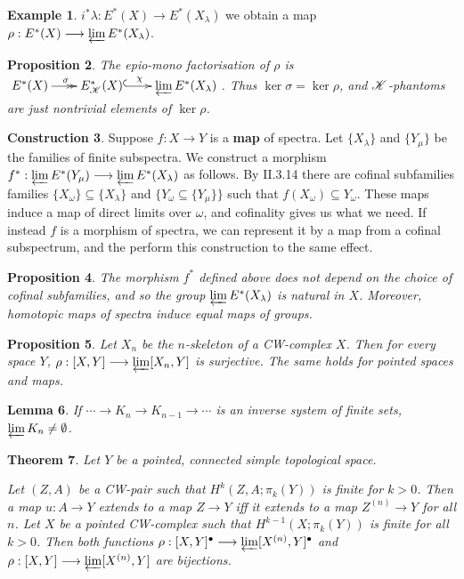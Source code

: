 \documentclass[11pt]{article}
\theoremstyle{plain}
\newtheorem{thm}{Theorem}[subsection]
\newtheorem{lem}[thm]{Lemma}
\newtheorem{prop}[thm]{Proposition}
\theoremstyle{definition}
\newtheorem{const}[thm]{Construction}
\newtheorem{exmp}[thm]{Example}
\begin{document}
{\begin{exmp}
$i^*\lambda:E^*(X)\to E^*(X_\lambda)$ we obtain a map $\rho:E^*(X)\to\varprojlim
E^*(X_\lambda)$.
\end{exmp}
\begin{prop}
The epio-mono factorisation of $\rho$ is
$\xymatrix@C=.7cm{E^*(X)\ar@{->>}[r]^\sigma&E^*_\scrK(X)
\ar@{^{(}->}[r]^{\chi\ \ }&\varprojlim E^*(X_\lambda)}$. Thus $\ker
\sigma=\ker\rho$, and $\scrK$-phantoms are just nontrivial elements of
$\ker\rho$.
\end{prop}
\begin{const}
Suppose $f:X\to Y$ is a \textbf{map} of spectra. Let $\{X_\lambda\}$ and
$\{Y_\mu\}$ be the families of finite subspectra. We construct a morphism
$f^*:\varprojlim E^*(Y_\mu)\to\varprojlim E^*(X_\lambda)$ as follows. By II.3.14
there are cofinal subfamilies families $\{X_\omega\}\subseteq \{X_\lambda\}$ and
$\{Y_\omega\subseteq\{Y_\mu\}\}$ such that $f(X_\omega)\subseteq Y_\omega$.
These maps induce a map of direct limits over $\omega$, and cofinality gives us
what we need. If instead $f$ is a morphism of spectra, we can represent it by a
map from a cofinal subspectrum, and the perform this construction to the same
effect.
\end{const}
\begin{prop}
The morphism $f^*$ defined above does not depend on the choice of cofinal
subfamilies, and so the group $\varprojlim E^*(X_\lambda)$ is natural in $X$.
Moreover, homotopic maps of spectra induce equal maps of groups.
\end{prop}
\begin{prop}
Let $X_n$ be the $n$-skeleton of a CW-complex $X$. Then for every space $Y$,
$\rho:[X,Y]\to \varprojlim[X_n,Y]$ is surjective. The same holds for pointed
spaces and maps.
\end{prop}
\begin{lem}
If $\cdots\rightarrow K_n\rightarrow K_{n-1}\rightarrow\cdots$ is an inverse
system of finite sets, $\varprojlim K_n\neq\emptyset$.
\end{lem}
\begin{thm}Let $Y$ be a pointed, connected simple topological space.
\begin{itemise}
\itm[(i)]Let $(Z,A)$ be a CW-pair such that $H^k(Z,A;\pi_k(Y))$ is finite for
$k>0$. Then a map $u:A\to Y$ extends to a map $Z\to Y$ iff it extends to a map
$Z^{(n)}\to Y$ for all $n$.
\itm[(ii)]Let $X$ be a pointed CW-complex such that $H^{k-1}(X;\pi_k(Y))$ is
finite for all $k>0$. Then both functions
$\rho:[X,Y]^\bullet\to\varprojlim[X^{(n)},Y]^\bullet$ and
$\rho:[X,Y]\to\varprojlim[X^{(n)},Y]$ are bijections.

\end{itemise}
\end{thm}}
\end{document}
